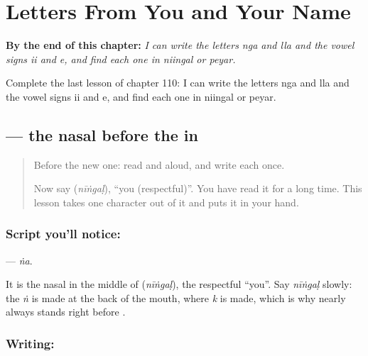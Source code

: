 
\chapter{Letters From You and Your Name}
\label{ch:ta-letters-from-you-and-your-name}

\begin{chapteropening}
\textbf{By the end of this chapter:} \emph{I can write the letters nga and lla and the vowel signs ii and e, and find each one in niingal or peyar.}

Complete the last lesson of chapter 110: I can write the letters nga and lla and the vowel signs ii and e, and find each one in niingal or peyar.
\end{chapteropening}

\section[\texorpdfstring{\ta{ங} (ṅa)}{ங (ṅa)}]{ — the nasal before the  in }

\label{lesson:TA-S130-letter-nga}



\begin{quote}
Before the new one: read  and  aloud, and write each once.

Now say \textbf{} (\emph{nīṅgaḷ}), \textquotedblleft{}you (respectful)\textquotedblright{}. You have read it for a long time. This lesson takes one character out of it and puts it in your hand.
\end{quote}

\subsection*{Script you'll notice: }
\textbf{} — \emph{ṅa}.

It is the nasal in the middle of \textbf{} (\emph{nīṅgaḷ}), the respectful \textquotedblleft{}you\textquotedblright{}. Say \emph{nīṅgaḷ} slowly: the \emph{ṅ} is made at the back of the mouth, where \emph{k} is made, which is why  nearly always stands right before .

\subsection*{Writing: }

